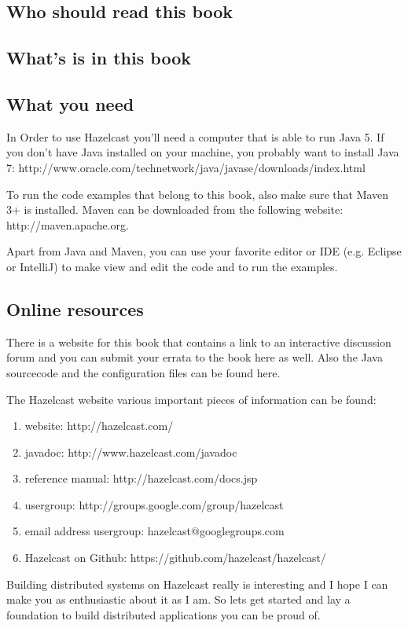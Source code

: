 \subsection*{Who should read this book}


\subsection*{What's is in this book}

\subsection*{What you need}
In Order to use Hazelcast you'll need a computer that is able to run Java 5. If you don't have Java installed on your machine,
you probably want to install Java 7: 
http://www.oracle.com/technetwork/java/javase/downloads/index.html

To run the code examples that belong to this book, also make sure that Maven 3+ is installed. Maven can be downloaded from the
following website: 
http://maven.apache.org.

Apart from Java and Maven, you can use your favorite editor or IDE (e.g. Eclipse or IntelliJ) to make view and edit the code 
and to run the examples. 

\subsection*{Online resources}

There is a website for this book that contains a link to an interactive discussion forum and you can submit your errata to the book 
here as well. Also the Java sourcecode and the configuration files can be found here. 

The Hazelcast website various important pieces of information can be found:
\begin{enumerate}
\item website: http://hazelcast.com/
\item javadoc: http://www.hazelcast.com/javadoc
\item reference manual: http://hazelcast.com/docs.jsp
\item usergroup: http://groups.google.com/group/hazelcast
\item email address usergroup: hazelcast@googlegroups.com
\item Hazelcast on Github: https://github.com/hazelcast/hazelcast/
\end{enumerate}

Building distributed systems on Hazelcast really is interesting and I hope I can make you as enthusiastic about it as I am. 
So lets get started and lay a foundation to build distributed applications you can be proud of.

